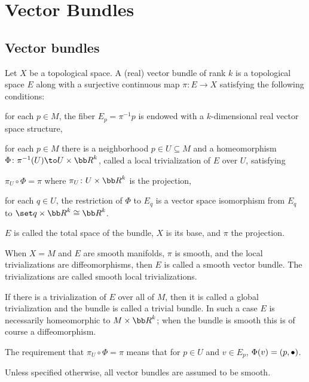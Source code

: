 \section{Vector Bundles}

\subsection{Vector bundles}

\bdefn

    Let $X$ be a topological space.
    A (real) {\emphcolor vector bundle} of rank $k$ is a topological space $E$ along with a surjective continuous map $\pi\colon E\to X$ satisfying the following conditions:
    \benum
        \item for each $p\in M$, the fiber $E_p=\pi^{-1}p$ is endowed with a $k$-dimensional real vector space structure,
        \item for each $p\in M$ there is a neighborhood $p\in U\subseteq M$ and a homeomorphism $\Phi\colon\pi^{-1}(U)\to U\times\bR^k$, called 
        a {\emphcolor local trivialization} of $E$ over $U$, satisfying
        \benum
            \item $\pi_U\circ\Phi=\pi$ where $\pi_U\colon U\times\bR^k$ is the projection,
            \item for each $q\in U$, the restriction of $\Phi$ to $E_q$ is a vector space isomorphism from $E_q$ to $\set q\times\bR^k\cong\bR^k$.
        \eenum
    \eenum

    $E$ is called the {\emphcolor total space} of the bundle, $X$ is its {\emphcolor base}, and $\pi$ the {\emphcolor projection}.

    When $X=M$ and $E$ are smooth manifolds, $\pi$ is smooth, and the local trivializations are diffeomorphisms, then $E$ is called a {\emphcolor smooth vector bundle}.
    The trivializations are called {\emphcolor smooth local trivializations}.

\edefn

If there is a trivialization of $E$ over all of $M$, then it is called a {\emphcolor global trivialization} and the bundle is called a {\emphcolor trivial bundle}.
In such a case $E$ is necessarily homeomorphic to $M\times\bR^k$; when the bundle is smooth this is of course a diffeomorphism.

The requirement that $\pi_U\circ\Phi=\pi$ means that for $p\in U$ and $v\in E_p$, $\Phi(v)=(p,\bullet)$.

\bnote

    Unless specified otherwise, all vector bundles are assumed to be smooth.

